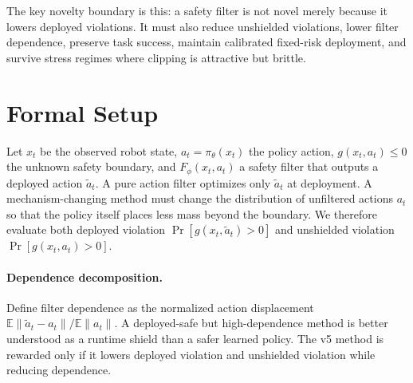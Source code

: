 \documentclass{article}
\begin{document}
The key novelty boundary is this: a safety filter is not novel merely because it lowers deployed violations. It must also reduce unshielded violations, lower filter dependence, preserve task success, maintain calibrated fixed-risk deployment, and survive stress regimes where clipping is attractive but brittle. \citep{r101109cdc5105920229992926,r101109iros20105650482,r10111514047439,r101126sciroboticsado6187,r1023919acc5051120219482848,r101007s11747019006960} \citep{r101109icma20115985854,r1048550arxivcs0006007,r101109ojits20233280573,r1010800954009120161271396,r1012019780429319778244,auraactiongatedmemoryforrobotpoliciesatcon} \citep{r101093iccdtad008,r101016jbirob2024100206,r1062311nesxrpj330062026,r101109lcsys20203005101,r101109lra20213097073,r103389frobt20261772005} \citep{visualnoveltydetectionforautonomousinspect,r101016jjprocont2024103329,r101109cdc4234020209304395,r101016jrcim2021102137,r101109lra20202976272,r107735ksmte2012211123} \citep{r101016jisatra202408030,r103390vehicles3030027,r101142s0219843619500117,r101016japenergy2024123507,r101609aaaiv35i1217272,r103390ijerph20054542} \citep{r103390s22030941,r101002rob21589,r101109lra20213068889,r101007978303121090721,r101016jssci2020104832,r101016jrcim2022102361} \citep{r1015612300000052,r101115detc201768280,r103390agronomy15010190,r101109tai20243351797,r101109tie20223148753,r101109lra20213076968} \citep{r10117709596518231153445,r101126sciroboticsabf1416,r101186s10033025012168,r101016jconengprac2024105901,r101109lra20243362643,r101109icra4663920229812048}

\section{Formal Setup}
Let $x_t$ be the observed robot state, $a_t=\pi_\theta(x_t)$ the policy action, $g(x_t,a_t)\leq 0$ the unknown safety boundary, and $F_\phi(x_t,a_t)$ a safety filter that outputs a deployed action $\tilde a_t$. A pure action filter optimizes only $\tilde a_t$ at deployment. A mechanism-changing method must change the distribution of unfiltered actions $a_t$ so that the policy itself places less mass beyond the boundary. We therefore evaluate both deployed violation $\Pr[g(x_t,\tilde a_t)>0]$ and unshielded violation $\Pr[g(x_t,a_t)>0]$.

\paragraph{Dependence decomposition.} Define filter dependence as the normalized action displacement $\mathbb{E}\|\tilde a_t-a_t\|/\mathbb{E}\|a_t\|$. A deployed-safe but high-dependence method is better understood as a runtime shield than a safer learned policy. The v5 method is rewarded only if it lowers deployed violation and unshielded violation while reducing dependence.
\end{document}
